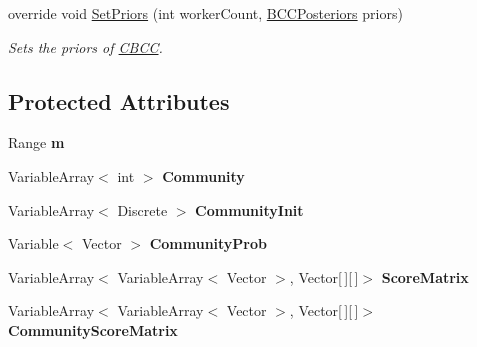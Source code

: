 \begin{DoxyCompactItemize}
override void \hyperlink{class_crowdsourcing_models_1_1_c_b_c_c_ab662d32f67474b73ad0ca6915d59901d}{Set\+Priors} (int worker\+Count, \hyperlink{class_crowdsourcing_models_1_1_b_c_c_posteriors}{B\+C\+C\+Posteriors} priors)
\begin{DoxyCompactList}\small\item\em Sets the priors of \hyperlink{class_crowdsourcing_models_1_1_c_b_c_c}{C\+B\+C\+C}. \end{DoxyCompactList}\end{DoxyCompactItemize}
\subsection*{Protected Attributes}
\begin{DoxyCompactItemize}
\item 
\hypertarget{class_crowdsourcing_models_1_1_c_b_c_c_a61ea38a925f1f5c35045d8e913efa2b9}{}Range {\bfseries m}\label{class_crowdsourcing_models_1_1_c_b_c_c_a61ea38a925f1f5c35045d8e913efa2b9}

\item 
\hypertarget{class_crowdsourcing_models_1_1_c_b_c_c_a3ce3100c9cfe1ab1973ca319226436c8}{}Variable\+Array$<$ int $>$ {\bfseries Community}\label{class_crowdsourcing_models_1_1_c_b_c_c_a3ce3100c9cfe1ab1973ca319226436c8}

\item 
\hypertarget{class_crowdsourcing_models_1_1_c_b_c_c_abb87ff094d5d2b6943533aa687be229c}{}Variable\+Array$<$ Discrete $>$ {\bfseries Community\+Init}\label{class_crowdsourcing_models_1_1_c_b_c_c_abb87ff094d5d2b6943533aa687be229c}

\item 
\hypertarget{class_crowdsourcing_models_1_1_c_b_c_c_aaa901257a56dc7c9f8093edab759bce2}{}Variable$<$ Vector $>$ {\bfseries Community\+Prob}\label{class_crowdsourcing_models_1_1_c_b_c_c_aaa901257a56dc7c9f8093edab759bce2}

\item 
\hypertarget{class_crowdsourcing_models_1_1_c_b_c_c_a2cf7340333c4216ecaa0fbcc85d24ab7}{}Variable\+Array$<$ Variable\+Array$<$ Vector $>$, Vector\mbox{[}$\,$\mbox{]}\mbox{[}$\,$\mbox{]}$>$ {\bfseries Score\+Matrix}\label{class_crowdsourcing_models_1_1_c_b_c_c_a2cf7340333c4216ecaa0fbcc85d24ab7}

\item 
\hypertarget{class_crowdsourcing_models_1_1_c_b_c_c_ac844f93790d57aabf155407f93e425d7}{}Variable\+Array$<$ Variable\+Array$<$ Vector $>$, Vector\mbox{[}$\,$\mbox{]}\mbox{[}$\,$\mbox{]}$>$ {\bfseries Community\+Score\+Matrix}\label{class_crowdsourcing_models_1_1_c_b_c_c_ac844f93790d57aabf155407f93e425d7}


\end{DoxyCompactItemize}
